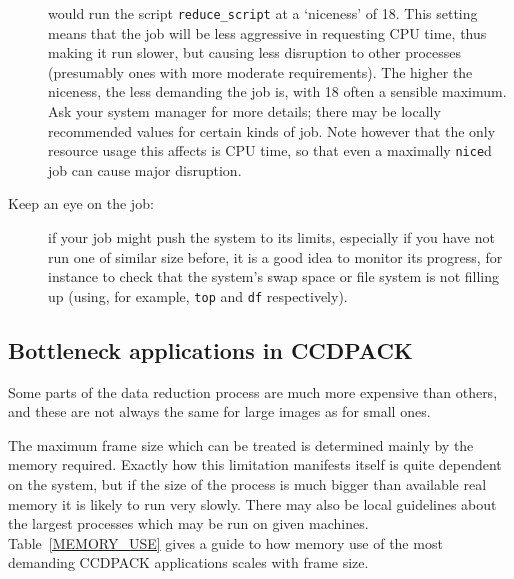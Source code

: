\documentclass[twoside,11pt]{starlink}
\begin{document}
\begin{description}
\begin{terminalv}
\end{terminalv}

   would run the script \texttt{reduce\_script} at a `niceness' of 18.
   This setting means that the job will be less aggressive in requesting
   CPU time, thus making it run slower, but causing less disruption to
   other processes (presumably ones with more moderate requirements).
   The higher the niceness, the less demanding the job is, with 18 often a
   sensible maximum.
   Ask your system manager for more details; there may be locally
   recommended values for certain kinds of job.
   Note however that the only resource usage this affects is CPU time,
   so that even a maximally \texttt{nice}d job can cause major disruption.

  \item[Keep an eye on the job:] if your job might push the system to its
   limits, especially if you have not run one of similar size before,
   it is a good idea to monitor its progress, for instance to check that
   the system's swap space or file system is not filling up
   (using, for example, \texttt{top} and \texttt{df} respectively).

\end{description}

\subsection{Bottleneck applications in CCDPACK}

Some parts of the data reduction process are much
more expensive than others,
and these are not always the same for large images as for small ones.

The maximum frame size which can be treated is
determined mainly by the memory required.
Exactly how this limitation manifests itself is quite
dependent on the system, but if the size of the process is
much bigger than available real memory it is likely to run very slowly.
There may also be local guidelines about the largest processes
which may be run on given machines.
Table~\ref{MEMORY_USE} gives a guide to how memory use of the most demanding
CCDPACK applications scales with frame size.
\end{document}
